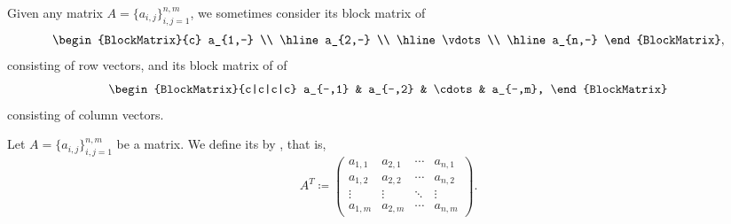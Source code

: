 \begin{definition}
  Given any matrix \( A = \{ a_{i,j} \}_{i,j=1}^{n,m} \), we sometimes consider its block matrix of 
  \begin{equation*}
    \begin{BlockMatrix}{c}
      a_{1,-} \\
      \hline
      a_{2,-} \\
      \hline
      \vdots \\
      \hline
      a_{n,-}
    \end{BlockMatrix},
  \end{equation*}
  consisting of row vectors, and its block matrix of of 
  \begin{equation*}
    \begin{BlockMatrix}{c|c|c|c}
      a_{-,1} & a_{-,2} & \cdots & a_{-,m},
    \end{BlockMatrix}
  \end{equation*}
  consisting of column vectors.
\end{definition}

\begin{definition}\label{def:matrix_transpose}
  Let \( A = \{ a_{i,j} \}_{i,j=1}^{n,m} \) be a matrix. We define its  by , that is,
  \begin{equation*}
    A^T \coloneqq \begin{pmatrix}
      a_{1,1} & a_{2,1} & \cdots & a_{n,1} \\
      a_{1,2} & a_{2,2} & \cdots & a_{n,2} \\
      \vdots  & \vdots  & \ddots & \vdots \\
      a_{1,m} & a_{2,m} & \cdots & a_{n,m}
    \end{pmatrix}.
  \end{equation*}
\end{definition}

